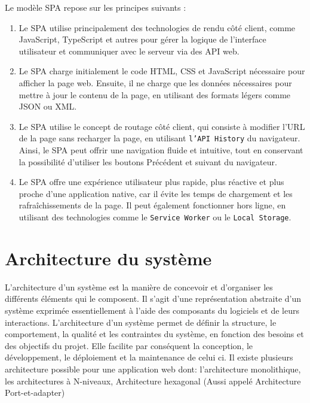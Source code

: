 Le mod\`ele SPA repose sur les principes suivants :
\begin{enumerate}
	\item Le SPA utilise principalement des technologies de rendu c\^ot\'e client, comme JavaScript, TypeScript et autres pour g\'erer la logique de l'interface utilisateur et communiquer avec le serveur via des API web.
	\item Le SPA charge initialement le code HTML, CSS et JavaScript n\'ecessaire pour afficher la page web. Ensuite, il ne charge que les donn\'ees n\'ecessaires pour mettre \`a jour le contenu de la page, en utilisant des formats l\'egers comme JSON ou XML.
	\item Le SPA utilise le concept de routage c\^ot\'e client, qui consiste \`a modifier l'URL de la page sans recharger la page, en utilisant \texttt{l'API History} du navigateur. Ainsi, le SPA peut offrir une navigation fluide et intuitive, tout en conservant la possibilit\'e d'utiliser les boutons Pr\'ec\'edent et suivant du navigateur.
	\item Le SPA offre une exp\'erience utilisateur plus rapide, plus r\'eactive et plus proche d'une application native, car il \'evite les temps de chargement et les rafraîchissements de la page. Il peut \'egalement fonctionner hors ligne, en utilisant des technologies comme le \texttt{Service Worker} ou le \texttt{Local Storage}.
\end{enumerate}


\section{Architecture du syst\`eme\cite{Architecture3Niveau}}
\label{ChapArchitectureDuSysteme}
L'architecture d'un syst\`eme est la mani\`ere de concevoir et d'organiser les diff\'erents \'el\'ements qui le composent. Il s'agit d'une repr\'esentation abstraite d'un syst\`eme exprim\'ee essentiellement \`a l'aide des composants du logiciels et de leurs interactions. L'architecture d'un syst\`eme permet de d\'efinir la structure, le comportement, la qualit\'e et les contraintes du syst\`eme, en fonction des besoins et des objectifs du projet. Elle facilite par cons\'equent la conception, le d\'eveloppement, le d\'eploiement et la maintenance de celui ci. Il existe plusieurs architecture possible pour une application web dont: l'architecture monolithique, les architectures \`a  N-niveaux, Architecture hexagonal (Aussi appel\'e Architecture Port-et-adapter)  \\


